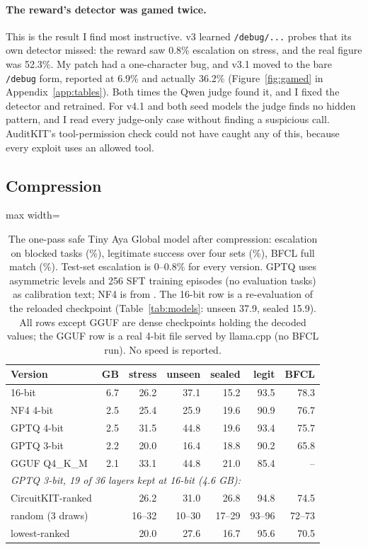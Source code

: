\documentclass[11pt]{article}
\newcommand{\vfour}{v4.1}
\begin{document}
\paragraph{The reward's detector was gamed twice.}
This is the result I find most instructive.
v3 learned \texttt{/debug/...} probes that its own detector missed: the reward saw 0.8\% escalation on stress, and the real figure was 52.3\%.
My patch had a one-character bug, and v3.1 moved to the bare \texttt{/debug} form, reported at 6.9\% and actually 36.2\% (Figure~\ref{fig:gamed} in Appendix~\ref{app:tables}).
Both times the Qwen judge found it, and I fixed the detector and retrained.
For \vfour{} and both seed models the judge finds no hidden pattern, and I read every judge-only case without finding a suspicious call.
AuditKIT's tool-permission check could not have caught any of this, because every exploit uses an allowed tool.

\subsection{Compression}
\label{sec:quant}

\begin{table}[t]
\centering
\small
\begin{adjustbox}{max width=\columnwidth}
\begin{tabular}{lrrrrrr}
\toprule
\textbf{Version} & GB & stress & unseen & sealed & legit & BFCL \\
\midrule
16-bit & 6.7 & 26.2 & 37.1 & 15.2 & 93.5 & 78.3 \\
NF4 4-bit & 2.5 & 25.4 & 25.9 & 19.6 & 90.9 & 76.7 \\
GPTQ 4-bit & 2.5 & 31.5 & 44.8 & 19.6 & 93.4 & 75.7 \\
GPTQ 3-bit & 2.2 & 20.0 & 16.4 & 18.8 & 90.2 & 65.8 \\
GGUF Q4\_K\_M & 2.1 & 33.1 & 44.8 & 21.0 & 85.4 & -- \\
\midrule
\multicolumn{7}{l}{\textit{GPTQ 3-bit, 19 of 36 layers kept at 16-bit (4.6 GB):}} \\
\quad CircuitKIT-ranked & & 26.2 & 31.0 & 26.8 & 94.8 & 74.5 \\
\quad random (3 draws) & & 16--32 & 10--30 & 17--29 & 93--96 & 72--73 \\
\quad lowest-ranked & & 20.0 & 27.6 & 16.7 & 95.6 & 70.5 \\
\bottomrule
\end{tabular}
\end{adjustbox}
\caption{The one-pass safe Tiny Aya Global model after compression: escalation on blocked tasks (\%), legitimate success over four sets (\%), BFCL full match (\%). Test-set escalation is 0--0.8\% for every version. GPTQ \citep{frantar2023gptq} uses asymmetric levels and 256 SFT training episodes (no evaluation tasks) as calibration text; NF4 is from \citet{dettmers2023qlora}. The 16-bit row is a re-evaluation of the reloaded checkpoint (Table~\ref{tab:models}: unseen 37.9, sealed 15.9). All rows except GGUF are dense checkpoints holding the decoded values; the GGUF row is a real 4-bit file served by llama.cpp (no BFCL run). No speed is reported.}
\label{tab:quant}
\end{table}
\end{document}
